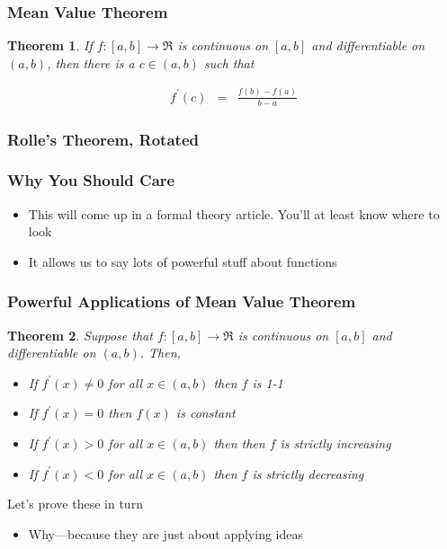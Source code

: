\documentclass{beamer}
\newtheorem{thm}{Theorem}
\numberwithin{equation}{section}
\begin{document}
\begin{frame}
\frametitle{Mean Value Theorem} 

\begin{thm} If $f:[a,b] \rightarrow \Re$ is continuous on $[a,b]$ and differentiable on $(a,b)$, then there is a $c \in (a,b)$ such that 

\begin{eqnarray}
f^{'}(c) & = & \frac{f(b) - f(a) } { b - a} \nonumber 
\end{eqnarray}
\end{thm}


\end{frame}


\begin{frame}
\frametitle{Rolle's Theorem, Rotated} 





\end{frame}


\begin{frame}
\frametitle{Why You Should Care}

\begin{itemize}
\item[1)] This will come up in a formal theory article.  You'll at least know where to look
\item[2)] \alert{It allows us to say lots of powerful stuff about functions}
\end{itemize}


\end{frame}


\begin{frame}
\frametitle{Powerful Applications of Mean Value Theorem}
\begin{thm}
Suppose that $f:[a,b] \rightarrow \Re$ is continuous on $[a,b]$ and differentiable on $(a,b)$.  Then, 
\begin{itemize}
\item[i)] If $f^{'}(x) \neq 0$ for all $x \in (a,b)$ then $f$ is 1-1
\item[ii)] If $f^{'}(x) = 0$ then $f(x)$ is constant 
\item[iii)] If $f^{'}(x)> 0$ for all $x \in (a,b)$ then then $f$ is strictly increasing
\item[iv)] If $f^{'}(x)<0$ for all $x \in (a,b)$ then $f$ is strictly decreasing
\end{itemize}
\end{thm}


\alert{Let's prove these in turn}
\begin{itemize}
\item[-] Why---because they are just about applying ideas
\end{itemize}


\end{frame}
\end{document}
